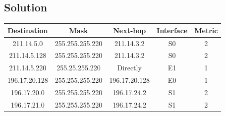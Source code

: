 \documentclass[11pt]{article}
\begin{document}
    \subsection{Solution}

    \begin{table}[H]
        \centering
        \begin{tabular}{|c|c|c|c|c|}
            \hline
            \textbf{Destination} & \textbf{Mask} & \textbf{Next-hop} & \textbf{Interface} & \textbf{Metric} \\
            \hline
            \hline
            211.14.5.0 & 255.255.255.220 & 211.14.3.2 & S0 &  2 \\
            \hline
            211.14.5.128 & 255.255.255.220 & 211.14.3.2 & S0 & 2 \\
            \hline
            211.14.5.220 & 255.25.255.220 & Directly & E1 & 1 \\
            \hline
            196.17.20.128 & 255.255.255.220 & 196.17.20.128 & E0 & 1 \\
            \hline
            196.17.20.0 & 255.255.255.220 & 196.17.24.2 & S1 & 2 \\
            \hline
            196.17.21.0 & 255.255.255.220 & 196.17.24.2 & S1 & 2 \\
            \hline
        \end{tabular}\label{tab:table-8}
    \end{table}
\end{document}
